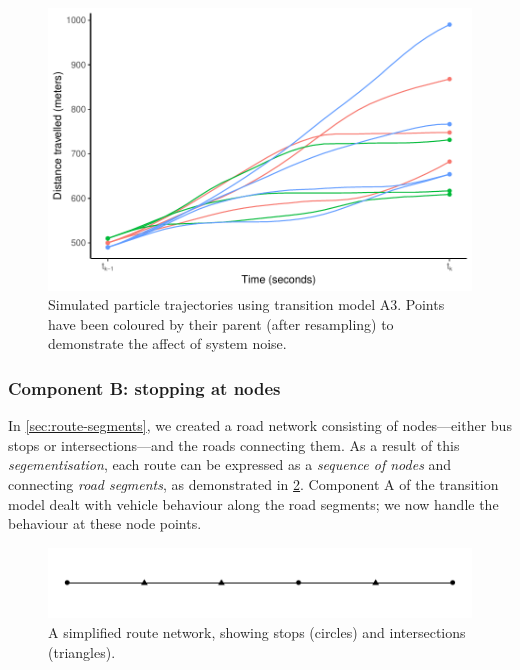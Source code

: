 \begin{knitrout}\small
{}\color{fgcolor}\begin{figure}

{\centering \includegraphics[width=.8\textwidth]{figure/transition_a3_demo-1} 

}

\caption[Simulated particle trajectories using transition model A3]{Simulated particle trajectories using transition model A3. Points have been coloured by their parent (after resampling) to demonstrate the affect of system noise.}\label{fig:transition_a3_demo}
\end{figure}


\end{knitrout}


\subsubsection{Component B: stopping at nodes}
\label{sec:vehicle_model_nodes}

In \cref{sec:route-segments}, we created a road network consisting of nodes---either bus stops or intersections---and the roads connecting them. As a result of this \emph{segementisation}, each route can be expressed as a \emph{sequence of nodes} and connecting \emph{road segments}, as demonstrated in \cref{fig:route-nodes}. Component A of the transition model dealt with vehicle behaviour along the road segments; we now handle the behaviour at these node points.

\begin{knitrout}\small
{}\color{fgcolor}\begin{figure}

{\centering \includegraphics[width=.8\textwidth]{figure/route-nodes-1} 

}

\caption[A simplified route network, showing stops (circles) and intersections (triangles)]{A simplified route network, showing stops (circles) and intersections (triangles).}\label{fig:route-nodes}
\end{figure}


\end{knitrout}

